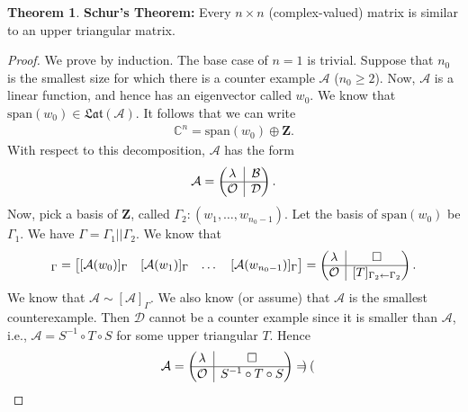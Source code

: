 \documentclass{article}
\theoremstyle{definition}
\newtheorem{thm}{Theorem}[section]
\newcommand{\Z}{\mathbf{Z}}
\newcommand{\xpan}{\text{span}}
\newcommand{\rvline}{\hspace*{-\arraycolsep}\vline\hspace*{-\arraycolsep}}
\begin{document}
\begin{thm}
	\textbf{Schur's Theorem:} Every $n\times n$ (complex-valued) matrix is similar to an upper triangular matrix.
	
	\begin{proof}
		We prove by induction. The base case of $n=1$ is trivial. Suppose that $n_0$ is the smallest size for which there is a counter example $\mathcal{A}$ ($n_0 \geq 2$). Now, $\mathcal{A}$ is a linear function, and hence has an eigenvector called $w_0$. We know that $\xpan(w_0) \in \mathfrak{Lat}(\mathcal{A})$. It follows that we can write
		\begin{align*}
		\mathbb{C}^n = \xpan(w_0) \oplus \Z.
		\end{align*} 
		With respect to this decomposition, $\mathcal{A}$ has the form
		\begin{align*}
		\mathcal{A} = \begin{pmatrix}
		\lambda & \rvline & \mathcal{B}\\
		\hline
		\mathcal{O} & \rvline & \mathcal{D}
		\end{pmatrix}.
		\end{align*}
		Now, pick a basis of $\Z$, called $\Gamma_2 : (w_{1},\dots,w_{n_0 - 1})$. Let the basis of $\xpan(w_0)$ be $\Gamma_1$. We have $\Gamma = \Gamma_1 || \Gamma_2$. We know that
		\begin{align*}
		[\mathcal{A}]_\Gamma = \begin{bmatrix}
		[\mathcal{A}(w_0)]_\Gamma & [\mathcal{A}(w_1)]_\Gamma & \dots & [\mathcal{A}(w_{n_0 - 1 })]_\Gamma
		\end{bmatrix}
		=
		\begin{pmatrix}
		\lambda & \rvline & \square\\
		\hline
		\mathcal{O} & \rvline & [T]_{\Gamma_2 \leftarrow \Gamma_2}
		\end{pmatrix}.
		\end{align*}
		We know that $\mathcal{A} \sim [\mathcal{A}]_\Gamma$. We also know (or assume) that $\mathcal{A}$ is the smallest counterexample. Then $\mathcal{D}$ cannot be a counter example since it is smaller than $\mathcal{A}$, i.e., $\mathcal{A} = S^{-1} \circ T \circ S$ for some upper triangular $T$. Hence
		\begin{align*}
		\mathcal{A} = \begin{pmatrix}
		\lambda & \rvline & \square\\
		\hline
		\mathcal{O} & \rvline & S^{-1}\circ T \circ S
		\end{pmatrix}
		=
		\begin{pmatrix}

\end{pmatrix}
\end{align*}
\end{proof}
\end{thm}
\end{document}
